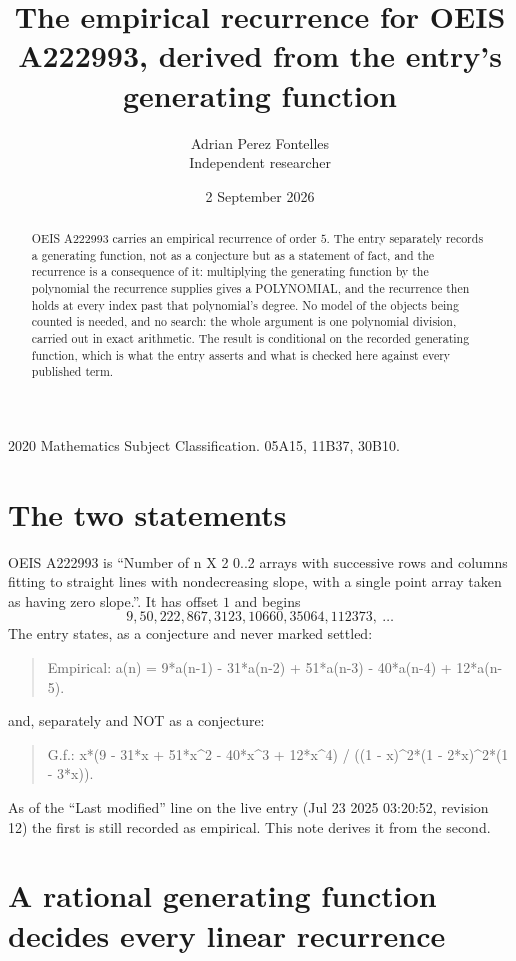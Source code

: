 \documentclass[11pt,a4paper]{article}
\title{The empirical recurrence for OEIS A222993, derived from the entry's generating function}
\author{Adrian Perez Fontelles\\ \small Independent researcher}
\date{2 September 2026}
\theoremstyle{plain}
\theoremstyle{definition}
\begin{document}
\maketitle

\begin{abstract}
OEIS A222993 carries an empirical recurrence of order $5$. The entry separately records a
generating function, not as a conjecture but as a statement of fact, and the recurrence is a
consequence of it: multiplying the generating function by the polynomial the recurrence
supplies gives a POLYNOMIAL, and the recurrence then holds at every index past that
polynomial's degree. No model of the objects being counted is needed, and no search: the
whole argument is one polynomial division, carried out in exact arithmetic. The result is
conditional on the recorded generating function, which is what the entry asserts and what is
checked here against every published term.
\end{abstract}

\noindent\small 2020 Mathematics Subject Classification. 05A15, 11B37, 30B10.\normalsize

\section{The two statements}

OEIS A222993 is ``Number of n X 2 0..2 arrays with successive rows and columns fitting to straight lines with nondecreasing slope, with a single point array taken as having zero slope.''. It has offset $1$ and begins
\[
9, 50, 222, 867, 3123, 10660, 35064, 112373,\ \dots
\]
The entry states, as a conjecture and never marked settled:
\begin{quote}
Empirical: a(n) = 9*a(n-1) - 31*a(n-2) + 51*a(n-3) - 40*a(n-4) + 12*a(n-5).
\end{quote}
and, separately and NOT as a conjecture:
\begin{quote}
G.f.: x*(9 - 31*x + 51*x\^{}2 - 40*x\^{}3 + 12*x\^{}4) / ((1 - x)\^{}2*(1 - 2*x)\^{}2*(1 - 3*x)).
\end{quote}
As of the ``Last modified'' line on the live entry (Jul 23 2025 03:20:52, revision 12) the first is still
recorded as empirical. This note derives it from the second.

\section{A rational generating function decides every linear recurrence}
\end{document}

